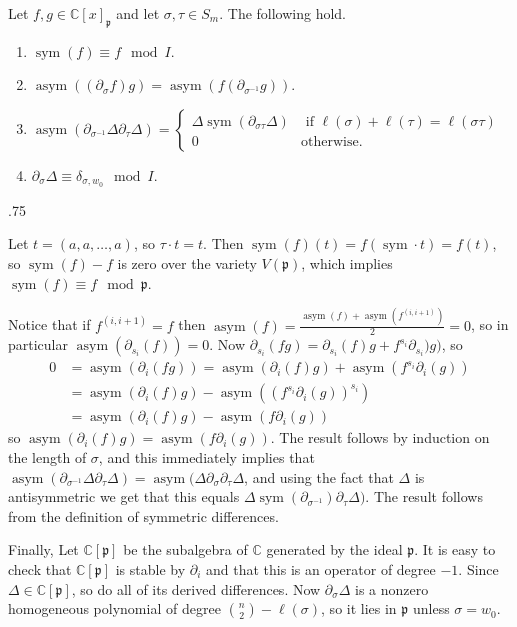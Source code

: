 \documentclass[11pt,fleqn]{article}
\makeatletter
\newcounter{para}[section]
\renewenvironment{proof}[1][\textit{Proof}]{\par
  \pushQED{\qed}%
  \normalfont \topsep.75\paraskip\relax
  \trivlist
  \item[\hskip\labelsep
        \itshape
    #1\@addpunct{.}]\ignorespaces
}{%
  \popQED\endtrivlist\@endpefalse
}
\newcommand\CC{\mathbb C}
\newcommand\p{\mathfrak p}
\DeclareMathOperator\sym{sym}
\DeclareMathOperator\asym{asym}
\makeatother
\begin{document}
\begin{Lemma}
Let $f,g \in \CC[x]_\p$ and let $\sigma, \tau \in S_m$. The following hold.
\begin{enumerate}
\item $\sym(f) \equiv f \mod I$.

\item $\asym((\partial_\sigma f) g) = \asym(f (\partial_{\sigma^{-1}}g))$.

\item $\asym(\partial_{\sigma^{-1}} \Delta \partial_\tau \Delta) = 
\begin{cases}
\Delta \sym(\partial_{\sigma \tau} \Delta) & \mbox{ if } 
\ell(\sigma) + \ell(\tau) = \ell(\sigma\tau) \\
0 & \mbox{otherwise}.
\end{cases}$

\item $\partial_\sigma \Delta \equiv \delta_{\sigma, w_0} \mod I$.
\end{enumerate}
\end{Lemma}
\begin{proof}
Let $t = (a, a, \ldots, a)$, so $\tau \cdot t = t$. Then $\sym(f)(t) = f(\sym 
\cdot t) = f(t)$, so $\sym(f) - f$ is zero over the variety $V(\p)$, which 
implies $\sym(f) \equiv f \mod \p$. 

Notice that if $f^{(i,i+1)} = f$ then $\asym(f) = \frac{\asym(f) + 
\asym(f^{(i,i+1)})}{2} = 0$, so in particular $\asym(\partial_{s_i}(f)) = 0$.
Now $\partial_{s_i}(fg) = \partial_{s_i}(f)g + f^{s_i}\partial_{s_i})g)$, so
\begin{align*}
0 
  &= \asym(\partial_i(fg)) 
  = \asym(\partial_i(f) g) + \asym(f^{s_i}\partial_i(g))\\
  &= \asym(\partial_i(f) g) - \asym((f^{s_i}\partial_i(g))^{s_i})\\
  &= \asym(\partial_i(f) g) - \asym(f\partial_i(g))
\end{align*}
so $\asym(\partial_i(f)g) = \asym(f \partial_i(g))$. The result follows by 
induction on the length of $\sigma$, and this immediately implies that 
$\asym(\partial_{\sigma^{-1}} \Delta \partial_\tau \Delta) = \asym(\Delta 
\partial_\sigma \partial_{\tau} \Delta$, and using the fact that 
$\Delta$ is antisymmetric we get that this equals $\Delta 
\sym(\partial_{\sigma^{-1}})\partial_{\tau} \Delta)$. The result follows
from the definition of symmetric differences.

Finally, Let $\CC[\p]$ be the subalgebra of $\CC$ generated by the ideal $\p$.
It is easy to check that $\CC[\p]$ is stable by $\partial_i$ and that this is
an operator of degree $-1$. Since $\Delta \in \CC[\p]$, so do all of its 
derived differences. Now $\partial_\sigma \Delta$ is a nonzero homogeneous 
polynomial of degree $\binom{n}{2} - \ell(\sigma)$, so it lies in $\p$ unless
$\sigma = w_0$.
\end{proof}
\end{document}
